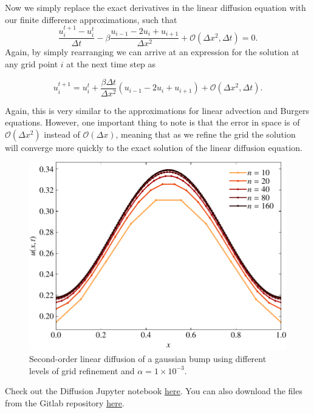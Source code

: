 Now we simply replace the exact derivatives in the linear diffusion equation with our finite difference approximations, such that
\begin{equation}
\frac{u_i^{t+1} - u_{i}^t}{\Delta t} - \beta \frac{u_{i-1} - 2u_i + u_{i+1}}{\Delta x^2} + \mathcal{O}(\Delta x^2,\Delta t) = 0.
\end{equation}
Again, by simply rearranging we can arrive at an expression for the solution at any grid point $i$ at the next time step as
\begin{eqBox}
\begin{equation}
u_i^{t+1}  = u_{i}^t + \frac{\beta \Delta t}{\Delta x^2} \left(u_{i-1} - 2u_i + u_{i+1}\right) + \mathcal{O}(\Delta x^2,\Delta t).
\label{eq:fd_diffusion}
\end{equation}
\end{eqBox}
Again, this is very similar to the approximations for linear advection and Burgers equations. However, one important thing to note is that the error in space is of $\mathcal{O}(\Delta x^2)$ instead of $\mathcal{O}(\Delta x)$, meaning that as we refine the grid the solution will converge more quickly to the exact solution of the linear diffusion equation.
\begin{figure}[htbp]
	\centering
	\includegraphics[width=0.65\linewidth]{Pictures/diffusion_central}
	\caption{Second-order linear diffusion of a gaussian bump using different levels of grid refinement and $\alpha=1\times 10^{-3}$.}
	\label{fig:diffusion_central}
\end{figure}
\begin{jupyternote}
	Check out the Diffusion Jupyter notebook \href{\binderurl}{\underline{here}}. You can also download the files from the Gitlab repository \href{\repourl}{\underline{here}}.
\end{jupyternote}

